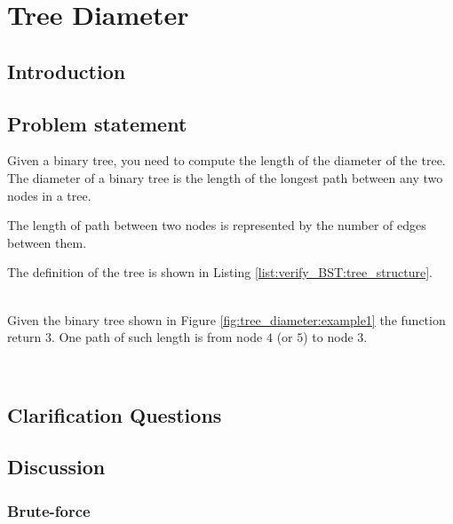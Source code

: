 %

\chapter{Tree Diameter}
\label{ch:tree_diameter}
\section*{Introduction}

\section{Problem statement}
\begin{exercise}
 Given a binary tree, you need to compute the length of the diameter of the tree. The diameter of a binary tree is the length of the longest path between any two nodes in a tree.

 The length of path between two nodes is represented by the number of edges between them.

 The definition of the tree is shown in Listing \ref{list:verify_BST:tree_structure}.


	\begin{example}
		\hfill \\
	Given the binary tree shown in Figure \ref{fig:tree_diameter:example1} the function return $3$. One path of such length is from node $4$ (or $5$) to node $3$.
	\end{example}

	\begin{example}
		\hfill \\
		
	\end{example}
\end{exercise}

\section{Clarification Questions}

\begin{QandA}
	\item 
	\begin{answered}
		\textit{}
	\end{answered}
	
\end{QandA}

\section{Discussion}
\label{tree_diameter:sec:discussion}


\subsection{Brute-force}
\label{tree_diameter:sec:bruteforce}




